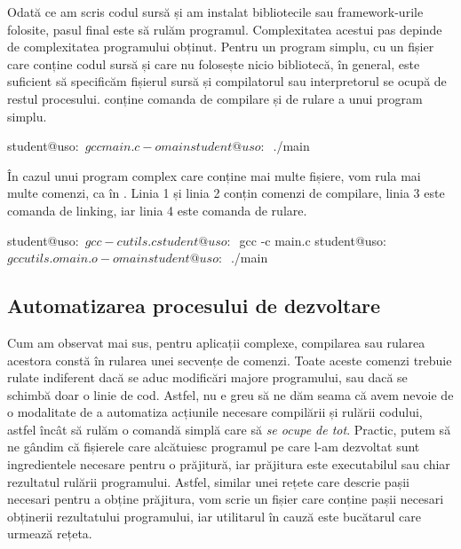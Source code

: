 Odată ce am scris codul sursă și am instalat bibliotecile sau framework-urile
folosite, pasul final este să rulăm programul. Complexitatea acestui pas depinde
de complexitatea programului obținut. Pentru un program simplu, cu un fișier
care conține codul sursă și care nu folosește nicio bibliotecă, în general, este
suficient să specificăm fișierul sursă și compilatorul sau interpretorul se
ocupă de restul procesului.  conține comanda de compilare și de rulare a unui program simplu.

\begin{screen}[caption={Compilarea și rularea unui program simplu},label={lst:appdev:simple-compile}]
student@uso:~$ gcc main.c -o main
student@uso:~$ ./main
\end{screen}

În cazul unui program complex care conține mai multe fișiere, vom rula mai multe comenzi, ca în . Linia 1 și linia 2 conțin comenzi de compilare, linia 3 este comanda de linking, iar linia 4 este comanda de rulare.

\begin{screen}[caption={Compilarea și rularea unui program din mai multe surse},label={lst:appdev:multiple-compile}]
student@uso:~$ gcc -c utils.c
student@uso:~$ gcc -c main.c
student@uso:~$ gcc utils.o main.o -o main
student@uso:~$ ./main
\end{screen}

\subsection{Automatizarea procesului de dezvoltare}
\label{sec:appdev:automation}

Cum am observat mai sus, pentru aplicații complexe, compilarea sau rularea
acestora constă în rularea unei secvențe de comenzi. Toate aceste comenzi
trebuie rulate indiferent dacă se aduc modificări majore programului, sau dacă
se schimbă doar o linie de cod. Astfel, nu e greu să ne dăm seama că avem nevoie
de o modalitate de a automatiza acțiunile necesare compilării și rulării
codului, astfel încât să rulăm o comandă simplă care să \textit{se ocupe de
tot}. Practic, putem să ne gândim că fișierele care alcătuiesc programul pe
care l-am dezvoltat sunt ingredientele necesare pentru o prăjitură, iar
prăjitura este executabilul sau chiar rezultatul rulării programului. Astfel,
similar unei rețete care descrie pașii necesari pentru a obține prăjitura, vom
scrie un fișier care conține pașii necesari obținerii rezultatului programului,
iar utilitarul în cauză este bucătarul care urmează rețeta.

